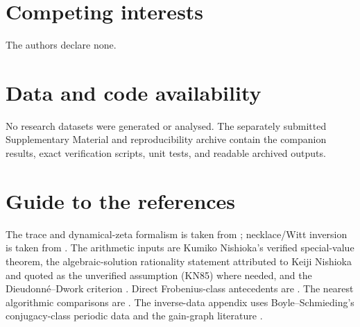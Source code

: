 \documentclass[11pt,a4paper]{amsart}
\theoremstyle{plain}
\theoremstyle{definition}
\theoremstyle{remark}
\begin{document}

\maketitle
\enlargethispage{4pt}







\appendix



\section*{Competing interests}
The authors declare none.

\section*{Data and code availability}
No research datasets were generated or analysed. The separately submitted
Supplementary Material and reproducibility archive contain the companion
results, exact verification scripts, unit tests, and readable archived
outputs.

\section*{Guide to the references}
The trace and dynamical-zeta formalism is taken from
\cite{BowenLanford1970Zeta,ParryPollicott1990Zeta}; necklace/Witt inversion
is taken from \cite{MetropolisRota1983Necklaces}.  The arithmetic inputs are
Kumiko Nishioka's verified special-value theorem, the algebraic-solution
rationality statement attributed to Keiji Nishioka and quoted as the
unverified assumption \textup{(KN85)} where needed, and the
Dieudonn\'e--Dwork criterion
\cite{Nishioka1982MahlerFunctionValues,Nishioka1985AlgebraicSolutions,
PomeratStraub2024RootsPowerSeries}.  Direct Frobenius-class antecedents are
\cite{ParryPollicott1986Chebotarev,NooraniParry1992ChebotarevShifts,
MeslizaNoorani1999FrobeniusMertens,Noorani2003ClosedOrbitsToral}.
The nearest algorithmic comparisons are
\cite{ChyzakDreyfusDumasMezzarobba2018MahlerSolutions,
ChyzakDreyfusDumasMezzarobba2025FirstOrderFactors}.  The inverse-data
appendix uses Boyle--Schmieding's conjugacy-class periodic data and the
gain-graph literature
\cite{BoyleSchmieding2017FiniteGroupExtensions,
CavaleriDAngeliDonno2021BalanceGainGraphs,CavaleriDonno2022Cospectrality,
AbiadBelardoKhramova2024Switching,Zaslavsky1989BiasedGraphs,
GrossTucker1987TopologicalGraphTheory}.



\end{document}
